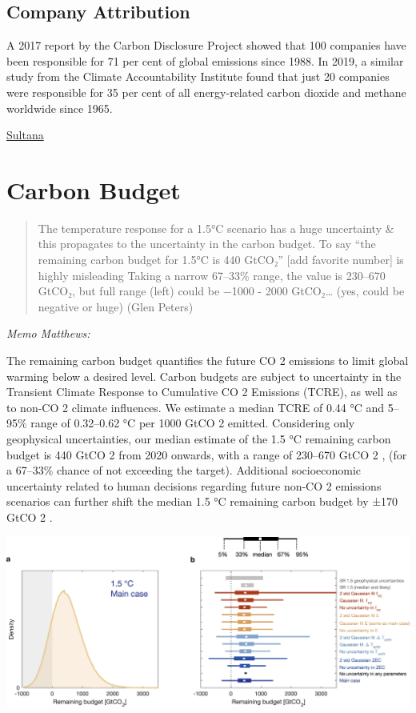 \documentclass[
]{book}
\begin{document}
\hypertarget{company-attribution}{%
\section{Company Attribution}\label{company-attribution}}

A 2017 report by the Carbon Disclosure Project showed that 100 companies have been responsible for 71 per cent of global emissions since 1988. In 2019, a similar study from the Climate Accountability Institute found that just 20 companies were responsible for 35 per cent of all energy-related carbon dioxide and methane worldwide since 1965.

\href{https://tribunemag.co.uk/2021/03/paper-straws-are-not-enough}{Sultana}

\hypertarget{carbon-budget}{%
\chapter{Carbon Budget}\label{carbon-budget}}

\begin{quote}
The temperature response for a 1.5°C scenario has a huge uncertainty \& this propagates to the uncertainty in the carbon budget.
To say ``the remaining carbon budget for 1.5°C is 440 GtCO₂'' {[}add favorite number{]} is highly misleading
Taking a narrow 67--33\% range, the value is 230--670 GtCO₂, but full range (left) could be −1000 - 2000 GtCO₂\ldots{} (yes, could be negative or huge)
(Glen Peters)
\end{quote}

\emph{Memo Matthews:}

The remaining carbon budget quantifies the future CO 2 emissions to limit global warming
below a desired level. Carbon budgets are subject to uncertainty in the Transient Climate
Response to Cumulative CO 2 Emissions (TCRE), as well as to non-CO 2 climate influences.
We estimate a median TCRE of 0.44 °C and 5--95\% range of 0.32--0.62 °C per 1000 GtCO 2
emitted. Considering only geophysical uncertainties, our median estimate of the 1.5 °C
remaining carbon budget is 440 GtCO 2 from 2020 onwards, with a range of 230--670
GtCO 2 , (for a 67--33\% chance of not exceeding the target). Additional socioeconomic
uncertainty related to human decisions regarding future non-CO 2 emissions scenarios can
further shift the median 1.5 °C remaining carbon budget by ±170 GtCO 2 .

\includegraphics{fig/carbon_budget.png}
\end{document}
